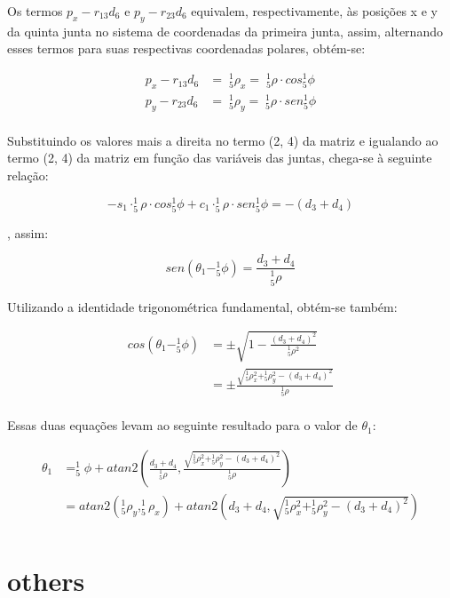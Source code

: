 Os termos $p_x-r_{13}d_6$ e $p_y-r_{23}d_6$ equivalem, respectivamente, às posições x e y da quinta junta no sistema 
de coordenadas da primeira junta, assim, alternando esses termos para suas respectivas coordenadas polares,
obtém-se:

\begin{align*}
    p_x - r_{13}d_6 &= \; ^1_5\rho_x = \; ^1_5\rho \cdot cos ^1_5\phi \\
    p_y - r_{23}d_6 &= \; ^1_5\rho_y = \; ^1_5\rho \cdot sen ^1_5\phi \\
\end{align*}

Substituindo os valores mais a direita no termo (2, 4) da matriz e igualando ao termo (2, 4) da matriz em função
das variáveis das juntas, chega-se à seguinte relação:

\begin{equation*}
    -s_1 \cdot ^1_5\rho \cdot cos ^1_5\phi + c_1 \cdot ^1_5\rho \cdot sen ^1_5\phi = - (d_3 + d_4)
\end{equation*}

, assim:

\begin{equation*}
    sen(\theta_1 - ^1_5\phi) = \frac{d_3+d_4}{^1_5\rho}
\end{equation*}

Utilizando a identidade trigonométrica fundamental, obtém-se também:

\begin{align*}
    cos(\theta_1 - ^1_5\phi) &= \pm \sqrt{1 - \frac{(d_3+d_4)^2}{^1_5\rho^2} } \\
                             &= \pm \frac{\sqrt{^1_5\rho_x^2 + ^1_5\rho_y^2 - (d_3+d_4)^2}}{^1_5\rho}  \\
\end{align*}

Essas duas equações levam ao seguinte resultado para o valor de $\theta_1$:

\begin{align*}
    \theta_1 &= ^1_5\phi + atan2\left(\frac{d_3+d_4}{^1_5\rho}, \frac{\sqrt{^1_5\rho_x^2 + ^1_5\rho_y^2 - (d_3+d_4)^2}}{^1_5\rho}\right) \\
             &= atan2(^1_5\rho_y, ^1_5\rho_x) + atan2\left(d_3+d_4,\sqrt{^1_5\rho_x^2 + ^1_5\rho_y^2 - (d_3+d_4)^2}\right) \\
\end{align*}

\section{others}

